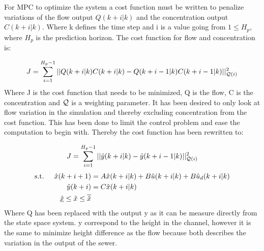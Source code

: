 

For MPC to optimize the system a cost function must be written to penalize variations of the flow output $Q(k+i|k)$ and the concentration output $C(k+i|k)$. Where k defines the time step and i is a value going from $1\leq H_p$, where $H_p$ is the prediction horizon. The cost function for flow and concentration is:

\begin{equation}
	 J = \sum_{i=1}^{H_p-1} || Q(k+i|k)C(k+i|k)-Q(k+i-1|k)C(k+i-1|k)||_{\CMcal{Q}(i)}^2
\end{equation}
Where J is the cost function that needs to be minimized, Q is the flow, C is the concentration and $\CMcal{Q}$ is a weighting parameter. It has been desired to only look at flow variation in the simulation and thereby excluding concentration from the cost function. This has been done to limit the control problem and ease the computation to begin with. Thereby the cost function has been rewritten to: 

\begin{equation}
	 J = \sum_{i=1}^{H_p-1} || \hat{y}(k+i|k)-\hat{y}(k+i-1|k)||_{\CMcal{Q}(i)}^2
\end{equation}
\begin{equation}
	\begin{aligned}
	\text{s.t.} \hspace{5mm}  \hat{x}(k+i+1) &= A\hat{x}(k+i|k)+B\hat{u}(k+i|k)+B\hat{u}_d(k+i|k) \\
						      \hat{y}(k+i)&= C\hat{x}(k+i|k) \\
						     \underline{\hat{x}} \leq \hat{x} \leq \overline{\hat{x}}
	\end{aligned}
\end{equation}
Where Q has been replaced with the output y as it can be measure directly from the state space system. y correspond to the height in the channel, however it is the same to minimize height difference as the flow because both describes the variation in the output of the sewer. 


